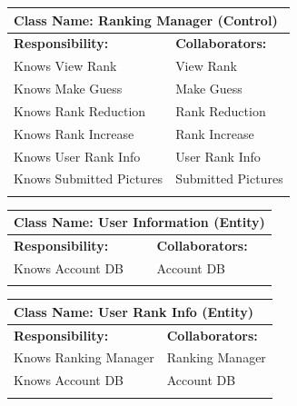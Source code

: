 \documentclass[]{article}
\begin{document}
	\begin{table}[H]
		\centering
		\begin{tabular}{|p{8cm}|p{8cm}|}
		\hline 
		 \multicolumn{2}{|l|}{\textbf{Class Name:} Ranking Manager (Control)} \\
		\hline
		\textbf{Responsibility:} & \textbf{Collaborators:} \\
		\hline
		Knows View Rank & View Rank \\
		Knows Make Guess & Make Guess \\
		Knows Rank Reduction & Rank Reduction \\
		Knows Rank Increase & Rank Increase \\
		Knows User Rank Info & User Rank Info \\
		Knows Submitted Pictures & Submitted Pictures \\
		\vspace{1in} & \\
		\hline
		\end{tabular}
	\end{table}

	\begin{table}[H]
		\centering
		\begin{tabular}{|p{8cm}|p{8cm}|}
		\hline 
		 \multicolumn{2}{|l|}{\textbf{Class Name:} User Information (Entity)} \\
		\hline
		\textbf{Responsibility:} & \textbf{Collaborators:} \\
		\hline
		Knows Account DB & Account DB \\
		\vspace{1in} & \\
		\hline
		\end{tabular}
	\end{table}

	\begin{table}[H]
		\centering
		\begin{tabular}{|p{8cm}|p{8cm}|}
		\hline 
		 \multicolumn{2}{|l|}{\textbf{Class Name:} User Rank Info (Entity)} \\
		\hline
		\textbf{Responsibility:} & \textbf{Collaborators:} \\
		\hline
		Knows Ranking Manager & Ranking Manager \\
		Knows Account DB & Account DB \\
		\vspace{1in} & \\
		\hline
		\end{tabular}
	\end{table}
\end{document}

